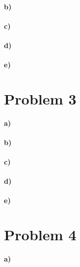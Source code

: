 \documentclass[12pt]{article}
\begin{document}
\paragraph{b)}

\paragraph{c)}

\paragraph{d)}

\paragraph{e)}

\section*{Problem 3}

\paragraph{a)}

\paragraph{b)}

\paragraph{c)}

\paragraph{d)}

\paragraph{e)}

\section*{Problem 4}

\paragraph{a)}
\end{document}
